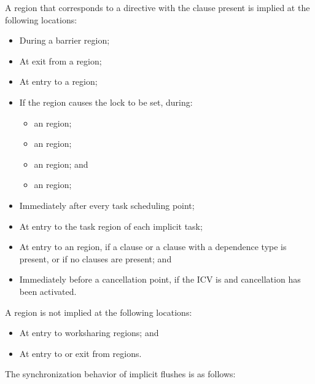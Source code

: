 A  region that corresponds to a  directive with the
 clause present is implied at the following locations:

\begin{itemize}
\item During a barrier region;
\item At exit from a  region;
\item At entry to a  region;
\item If the region causes the lock to be set, during:
\begin{itemize}
\item an  region;
\item an  region;
\item an  region; and 
\item an  region;
\end{itemize} 
\item Immediately after every task scheduling point;
\item At entry to the task region of each implicit task;
\item At entry to an  region, if a  clause or a 
       clause with a  dependence type is present, or 
      if no clauses are present; and
\item Immediately before a cancellation point, if the  ICV is
       and cancellation has been activated.
\end{itemize}

\begin{note}
A  region is not implied at the following locations:
\begin{itemize}
\item At entry to worksharing regions; and
\item At entry to or exit from  regions.
\end{itemize}
\end{note}

The synchronization behavior of implicit flushes is as follows:

